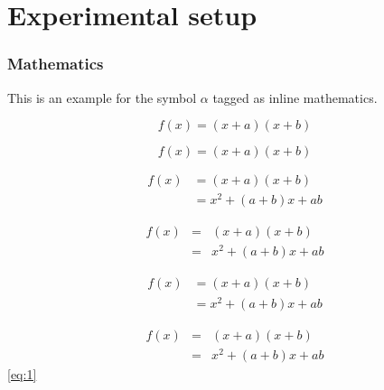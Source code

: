 \documentclass[preprint,12pt]{elsarticle}
\begin{document}
\section{Experimental setup} \label{sec3}
\subsubsection{Mathematics}
This is an example for the symbol $\alpha$ tagged as inline mathematics.

\begin{equation}
f(x) = (x+a)(x+b)
\end{equation}

\begin{equation*}
f(x) = (x+a)(x+b)
\end{equation*}

\begin{align}\label{eq:1}
 f(x) &= (x+a)(x+b) \\
      &= x^2 + (a+b)x + ab
\end{align}

\begin{eqnarray}
 f(x) &=& (x+a)(x+b) \nonumber\\ %
      &=& x^2 + (a+b)x + ab
\end{eqnarray}

\begin{align*}
 f(x) &= (x+a)(x+b) \\
      &= x^2 + (a+b)x + ab
\end{align*}

\begin{eqnarray*}
 f(x)&=& (x+a)(x+b) \\
     &=& x^2 + (a+b)x + ab
\end{eqnarray*}
\eqref{eq:1}
\end{document}
